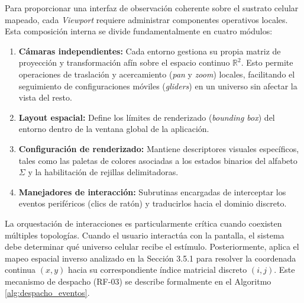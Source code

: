Para proporcionar una interfaz de observación coherente sobre el sustrato celular mapeado, cada \textit{Viewport} requiere administrar componentes operativos locales. Esta composición interna se divide fundamentalmente en cuatro módulos:

\begin{enumerate}
    \item \textbf{Cámaras independientes:} Cada entorno gestiona su propia matriz de proyección y transformación afín sobre el espacio continuo $\mathbb{R}^2$. Esto permite operaciones de traslación y acercamiento (\textit{pan} y \textit{zoom}) locales, facilitando el seguimiento de configuraciones móviles (\textit{gliders}) en un universo sin afectar la vista del resto.
    \item \textbf{Layout espacial:} Define los límites de renderizado (\textit{bounding box}) del entorno dentro de la ventana global de la aplicación.
    \item \textbf{Configuración de renderizado:} Mantiene descriptores visuales específicos, tales como las paletas de colores asociadas a los estados binarios del alfabeto $\Sigma$ y la habilitación de rejillas delimitadoras.
    \item \textbf{Manejadores de interacción:} Subrutinas encargadas de interceptar los eventos periféricos (clics de ratón) y traducirlos hacia el dominio discreto.
\end{enumerate}

La orquestación de interacciones es particularmente crítica cuando coexisten múltiples topologías. Cuando el usuario interactúa con la pantalla, el sistema debe determinar qué universo celular recibe el estímulo. Posteriormente, aplica el mapeo espacial inverso analizado en la Sección 3.5.1 para resolver la coordenada continua $(x,y)$ hacia su correspondiente índice matricial discreto $(i,j)$. Este mecanismo de despacho (RF-03) se describe formalmente en el Algoritmo \ref{alg:despacho_eventos}.

